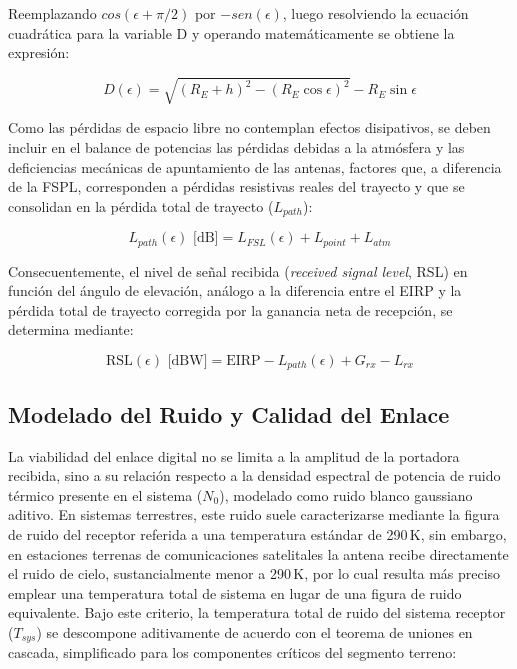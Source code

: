 Reemplazando $cos(\epsilon+\pi/2)$ por $-sen(\epsilon)$, luego resolviendo la ecuación cuadrática para la variable D y operando matemáticamente se obtiene la expresión:

\begin{equation}
    D(\epsilon) = \sqrt{(R_E + h)^2 - (R_E \cos\epsilon)^2} - R_E \sin\epsilon
    \label{eq:geometria_orbita}
\end{equation}

Como las pérdidas de espacio libre no contemplan efectos disipativos, se deben incluir en el balance de potencias las pérdidas debidas a la atmósfera y las deficiencias mecánicas de apuntamiento de las antenas, factores que, a diferencia de la FSPL, corresponden a pérdidas resistivas reales del trayecto y que se consolidan en la pérdida total de trayecto ($L_{path}$):

\begin{equation}
    L_{path}(\epsilon) \text{ [dB]} = L_{FSL}(\epsilon) + L_{point} + L_{atm}
    \label{eq:pérdidas_totales}
\end{equation}

Consecuentemente, el nivel de señal recibida (\textit{received signal level}, RSL) en función del ángulo de elevación, análogo a la diferencia entre el EIRP y la pérdida total de trayecto corregida por la ganancia neta de recepción, se determina mediante:

\begin{equation}
    \text{RSL}(\epsilon) \text{ [dBW]} = \text{EIRP} - L_{path}(\epsilon) + G_{rx} - L_{rx}
    \label{eq:rsl_formal}
\end{equation}

\subsection{Modelado del Ruido y Calidad del Enlace}
La viabilidad del enlace digital no se limita a la amplitud de la portadora recibida, sino a su relación respecto a la densidad espectral de potencia de ruido térmico presente en el sistema ($N_0$), modelado como ruido blanco gaussiano aditivo. En sistemas terrestres, este ruido suele caracterizarse mediante la figura de ruido del receptor referida a una temperatura estándar de 290\,K, sin embargo, en estaciones terrenas de comunicaciones satelitales la antena recibe directamente el ruido de cielo, sustancialmente menor a 290\,K, por lo cual resulta más preciso emplear una temperatura total de sistema en lugar de una figura de ruido equivalente. Bajo este criterio, la temperatura total de ruido del sistema receptor ($T_{sys}$) se descompone aditivamente de acuerdo con el teorema de uniones en cascada, simplificado para los componentes críticos del segmento terreno:

